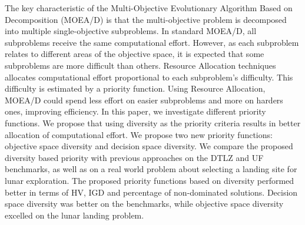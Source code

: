 The key characteristic of the Multi-Objective Evolutionary Algorithm Based on
Decomposition (MOEA/D) is that the multi-objective problem is decomposed into
multiple single-objective subproblems.
%
In standard MOEA/D, all subproblems receive the same computational effort.
However, as each subproblem relates to different areas of the objective space,
it is expected that some subproblems are more difficult than others.
%
Resource Allocation techniques allocates computational effort proportional to
each subproblem's difficulty. This difficulty is estimated by a priority
function. Using Resource Allocation, MOEA/D could spend less effort on easier
subproblems and more on harders ones, improving efficiency.
%
In this paper, we investigate different priority functions. We propose that
using diversity as the priority criteria results in better allocation of
computational effort.
%
We propose two new priority functions: objective space diversity and decision
space diversity.
%
We compare the proposed diversity based priority with previous approaches on the
DTLZ and UF benchmarks, as well as on a real world problem about selecting a
landing site for lunar exploration.
%
The proposed priority functions based on diversity performed better in terms of
HV, IGD and percentage of non-dominated solutions. Decision space diversity was
better on the benchmarks, while objective space diversity excelled on the lunar
landing problem.
